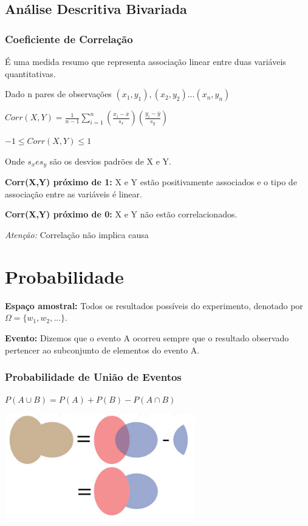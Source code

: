 \documentclass[a4paper, 12pt]{article}
\begin{document}
\subsection{Análise Descritiva Bivariada}
\subsubsection{Coeficiente de Correlação}
	É uma medida resumo que representa associação linear entre duas variáveis quantitativas.
	
	Dado n pares de observações $(x_{1}, y_{1}), (x_{2}, y_{2}) ... (x_{n}, y_{n})$
	\begin{center}
		\LARGE
		$Corr(X, Y) = \frac{1}{n-1} \sum_{i = 1}^{n} (\frac{x_{i} - \overline{x}}{s_{x}})(\frac{y_{i} - \overline{y}}{s_{y}})$
		\normalsize
		
		$-1\leq Corr(X,Y) \leq 1$
	\end{center}
	Onde $ s_{x} e s_{y}$ são os desvios padrões de X e Y.
	
	\textbf{Corr(X,Y) próximo de 1:} X e Y estão positivamente associados e o tipo de associação entre as variáveis é linear.
	
	\textbf{Corr(X,Y) próximo de 0:} X e Y não estão correlacionados.
	
	\textit{Atenção:} Correlação não implica causa
	
\section{Probabilidade}
	\textbf{Espaço amostral:} Todos os resultados possíveis do experimento, denotado por \\$\Omega = \{w_{1},w_{2},...\}$.
	
	\textbf{Evento:} Dizemos que o evento A ocorreu sempre que o resultado observado pertencer ao subconjunto de elementos do evento A.
	
\subsubsection{Probabilidade de União de Eventos}
	\begin{center}
		\LARGE
		$P(A\cup B) = P(A) + P(B) - P(A\cap B)$
	\end{center}
	\begin{center}
		\includegraphics[width=0.5\linewidth]{imagens/prob}
	\end{center}
	
\end{document}
